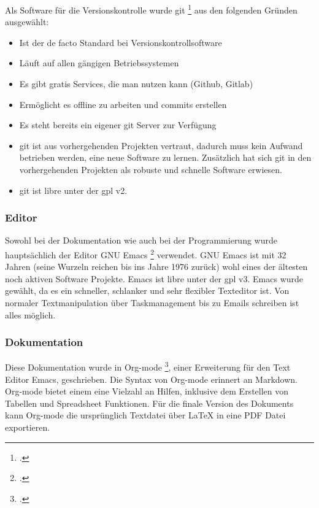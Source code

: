 Als Software für die Versionskontrolle wurde \gls{git} \footcite{git} aus den
folgenden Gründen ausgewählt:

\begin{itemize}
\item Ist der de facto Standard bei Versionskontrollsoftware
\item Läuft auf allen gängigen Betriebssystemen
\item Es gibt gratis Services, die man nutzen kann (Github, Gitlab)
\item Ermöglicht es offline zu arbeiten und \glspl{commit} erstellen
\item Es steht bereits ein eigener \gls{git} Server zur Verfügung
\item \gls{git} ist aus vorhergehenden Projekten vertraut,
dadurch muss kein Aufwand betrieben werden, eine neue Software zu lernen.
Zusätzlich hat sich \gls{git} in den vorhergehenden Projekten als robuste
und schnelle Software erwiesen.
\item \gls{git} ist \gls{libre} unter der \gls{gpl} v2.
\end{itemize}

\subsubsection{Editor}
\label{sec:org99f5c71}

Sowohl bei der Dokumentation wie auch bei der Programmierung wurde
hauptsächlich der Editor GNU Emacs \footcite{emacs} verwendet. GNU Emacs ist mit
32 Jahren (seine Wurzeln reichen bis ins Jahre 1976 zurück) wohl eines der
ältesten noch aktiven Software Projekte. Emacs ist \gls{libre} unter der \gls{gpl}
v3. Emacs wurde gewählt, da es ein schneller, schlanker und sehr flexibler
Texteditor ist. Von normaler Textmanipulation über Taskmanagement bis zu Emails
schreiben ist alles möglich.
\pagebreak
\subsubsection{Dokumentation}
\label{sec:org4b11da7}

Diese Dokumentation wurde in Org-mode \footcite{orgmode}, einer Erweiterung für
den Text Editor Emacs, geschrieben. Die Syntax von Org-mode erinnert an
Markdown. Org-mode bietet einem eine Vielzahl an Hilfen, inklusive dem
Erstellen von Tabellen und Spreadsheet Funktionen. Für die finale Version des
Dokuments kann Org-mode die ursprünglich Textdatei über \LaTeX{} in eine PDF Datei
exportieren.

